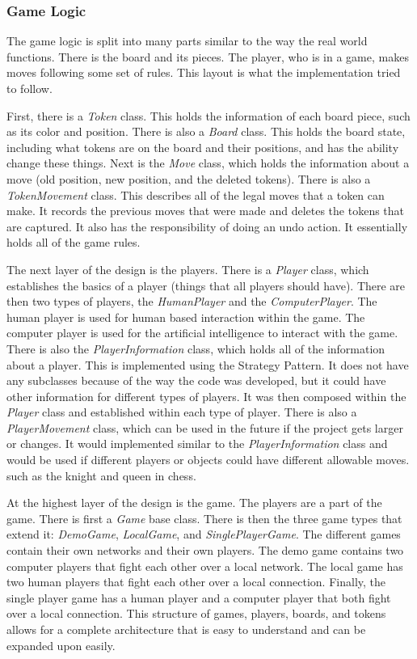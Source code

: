 \documentclass{article}
\begin{document}
\subsubsection{Game Logic}
	The game logic is split into many parts similar to the way the real world functions. There is the board and its pieces. The player, who is in a game, makes moves following some set of rules. This layout is what the implementation tried to follow.\par
	First, there is a \textit{Token} class. This holds the information of each board piece, such as its color and position. There is also a \textit{Board} class. This holds the board state, including what tokens are on the board and their positions, and has the ability change these things. Next is the \textit{Move} class, which holds the information about a move (old position, new position, and the deleted tokens). There is also a \textit{TokenMovement} class. This describes all of the legal moves that a token can make. It records the previous moves that were made and deletes the tokens that are captured. It also has the responsibility of doing an undo action. It essentially holds all of the game rules. \par
	The next layer of the design is the players. There is a \textit{Player} class, which establishes the basics of a player (things that all players should have). There are then two types of players, the \textit{HumanPlayer} and the \textit{ComputerPlayer}. The human player is used for human based interaction within the game. The computer player is used for the artificial intelligence to interact with the game. There is also the \textit{PlayerInformation} class, which holds all of the information about a player. This is implemented using the Strategy Pattern. It does not have any subclasses because of the way the code was developed, but it could have other information for different types of players. It was then composed within the \textit{Player} class and established within each type of player. There is also a \textit{PlayerMovement} class, which can be used in the future if the project gets larger or changes. It would implemented similar to the \textit{PlayerInformation} class and would be used if different players or objects could have different allowable moves. such as the knight and queen in chess.\par
	At the highest layer of the design is the game. The players are a part of the game. There is first a \textit{Game} base class. There is then the three game types that extend it: \textit{DemoGame}, \textit{LocalGame}, and \textit{SinglePlayerGame}. The different games contain their own networks and their own players. The demo game contains two computer players that fight each other over a local network. The local game has two human players that fight each other over a local connection. Finally, the single player game has a human player and a computer player that both fight over a local connection. This structure of games, players, boards, and tokens allows for a complete architecture that is easy to understand and can be expanded upon easily. 
\end{document}
